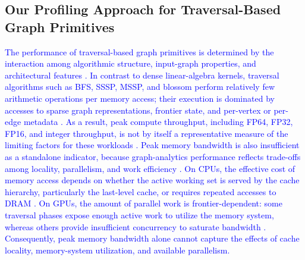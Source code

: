 \subsection{Our Profiling Approach for Traversal-Based Graph Primitives}
\label{subsec:profiling_method}
\label{para:metric-selection-justification}
\textcolor{blue}{
The performance of traversal-based graph primitives is determined by the interaction among algorithmic structure, input-graph properties, and architectural features \cite{graphit_gpu}.
    In contrast to dense linear-algebra kernels, traversal algorithms such as BFS, SSSP, MSSP, and blossom perform relatively few arithmetic operations per memory access; their execution is dominated by accesses to sparse graph representations, frontier state, and per-vertex or per-edge metadata \cite{wang2016gunrock,green2019memorychannels}.
    As a result, peak compute throughput, including FP64, FP32, FP16, and integer throughput, is not by itself a representative measure of the limiting factors for these workloads \cite{beamer2016understanding}.
    Peak memory bandwidth is also insufficient as a standalone indicator, because graph-analytics performance reflects trade-offs among locality, parallelism, and work efficiency \cite{beamer2015gail}.
    On CPUs, the effective cost of memory access depends on whether the active working set is served by the cache hierarchy, particularly the last-level cache, or requires repeated accesses to DRAM \cite{mukkara2017cache}.
    On GPUs, the amount of parallel work is frontier-dependent: some traversal phases expose enough active work to utilize the memory system, whereas others provide insufficient concurrency to saturate bandwidth \cite{beamer2013direction,bfs_levelsync}.
    Consequently, peak memory bandwidth alone cannot capture the effects of cache locality, memory-system utilization, and available parallelism.
}
